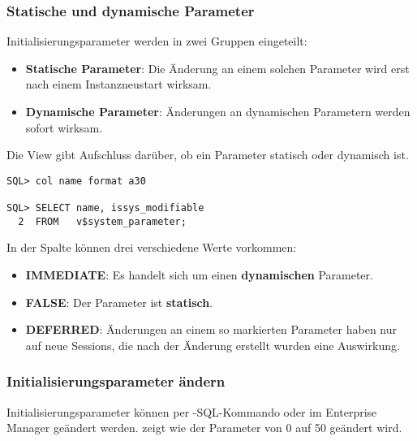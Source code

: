         \subsubsection{Statische und dynamische Parameter}
          Initialisierungsparameter werden in zwei Gruppen eingeteilt:
          \begin{itemize}
            \item \textbf{Statische Parameter}: Die Änderung an einem solchen Parameter wird erst nach einem Instanzneustart wirksam.
            \item \textbf{Dynamische Parameter}: Änderungen an dynamischen Parametern werden sofort wirksam.
          \end{itemize}
          Die View  gibt Aufschluss darüber, ob ein Parameter statisch oder dynamisch ist.
          \begin{lstlisting}[caption={Unterscheiden zwischen dynamischen und statischen Parametern},label=admin14,language=oracle_sql,alsolanguage=sqlplus]
SQL> col name format a30

SQL> SELECT name, issys_modifiable
  2  FROM   v$system_parameter;
          \end{lstlisting}
          In der Spalte  können drei verschiedene Werte vorkommen:
          \begin{itemize}
            \item \textbf{IMMEDIATE}: Es handelt sich um einen \textbf{dynamischen} Parameter.
            \item \textbf{FALSE}: Der Parameter ist \textbf{statisch}.
            \item \textbf{DEFERRED}: Änderungen an einem so markierten Parameter haben nur auf neue Sessions, die nach der Änderung erstellt wurden eine Auswirkung.
          \end{itemize}
        \subsubsection{Initialisierungsparameter ändern}
          Initialisierungsparameter können per -SQL-Kommando oder im Enterprise Manager geändert werden.  zeigt wie der Parameter  von 0 auf 50 geändert wird.
  
